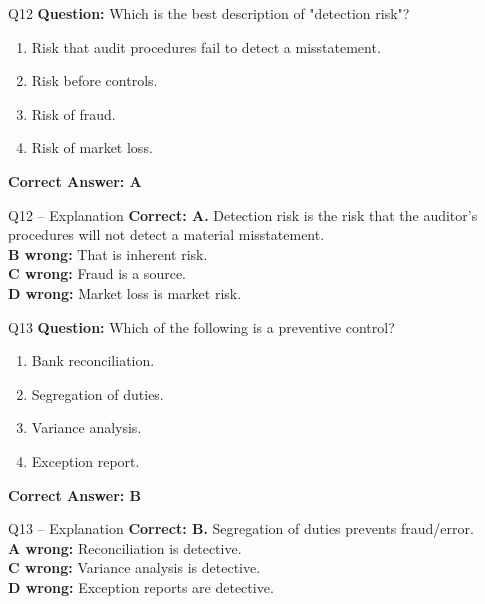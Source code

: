 \documentclass[aspectratio=169,10pt]{beamer}
\begin{document}
	\begin{frame}[t]{Q12}
		\small
		\textbf{Question:} Which is the best description of "detection risk"?
		\begin{enumerate}[label=\Alph*.,itemsep=1pt,topsep=2pt]
			\item Risk that audit procedures fail to detect a misstatement.
			\item Risk before controls.
			\item Risk of fraud.
			\item Risk of market loss.
		\end{enumerate}
		\vspace{4pt}
		\textbf{Correct Answer: A}
	\end{frame}
	
	\begin{frame}[t]{Q12 -- Explanation}
		\small
		\textbf{Correct: A.} Detection risk is the risk that the auditor's procedures will not detect a material misstatement. \\[4pt]
		\textbf{B wrong:} That is inherent risk. \\[2pt]
		\textbf{C wrong:} Fraud is a source. \\[2pt]
		\textbf{D wrong:} Market loss is market risk.
	\end{frame}
	
	\begin{frame}[t]{Q13}
		\small
		\textbf{Question:} Which of the following is a preventive control?
		\begin{enumerate}[label=\Alph*.,itemsep=1pt,topsep=2pt]
			\item Bank reconciliation.
			\item Segregation of duties.
			\item Variance analysis.
			\item Exception report.
		\end{enumerate}
		\vspace{4pt}
		\textbf{Correct Answer: B}
	\end{frame}
	
	\begin{frame}[t]{Q13 -- Explanation}
		\small
		\textbf{Correct: B.} Segregation of duties prevents fraud/error. \\[4pt]
		\textbf{A wrong:} Reconciliation is detective. \\[2pt]
		\textbf{C wrong:} Variance analysis is detective. \\[2pt]
		\textbf{D wrong:} Exception reports are detective.
	\end{frame}
	
\end{document}
